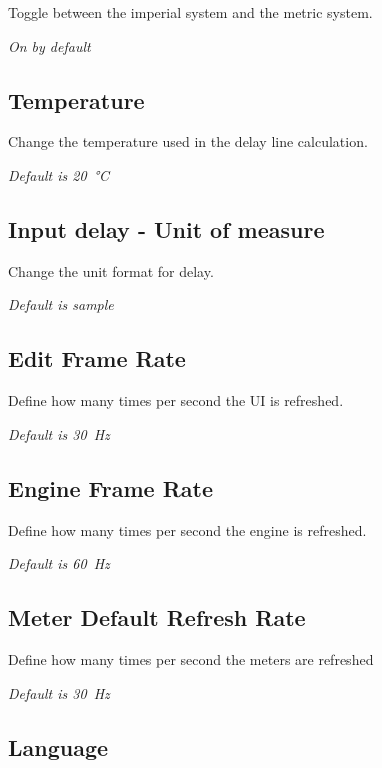 \documentclass[
  letterpaper,
  DIV=11,
  numbers=noendperiod]{scrreport}
\begin{document}
Toggle between the imperial system and the metric system.

\emph{On by default}

\hypertarget{temperature}{%
\subsection{Temperature}\label{temperature}}

Change the temperature used in the delay line calculation.

\emph{Default is 20~°C}

\hypertarget{input-delay---unit-of-measure}{%
\subsection{Input delay - Unit of
measure}\label{input-delay---unit-of-measure}}

Change the unit format for delay.

\emph{Default is sample}

\hypertarget{edit-frame-rate}{%
\subsection{Edit Frame Rate}\label{edit-frame-rate}}

Define how many times per second the UI is refreshed.

\emph{Default is 30~Hz}

\hypertarget{engine-frame-rate}{%
\subsection{Engine Frame Rate}\label{engine-frame-rate}}

Define how many times per second the engine is refreshed.

\emph{Default is 60~Hz}

\hypertarget{meter-default-refresh-rate}{%
\subsection{Meter Default Refresh
Rate}\label{meter-default-refresh-rate}}

Define how many times per second the meters are refreshed

\emph{Default is 30~Hz}

\hypertarget{language}{%
\subsection{Language}\label{language}}
\end{document}
